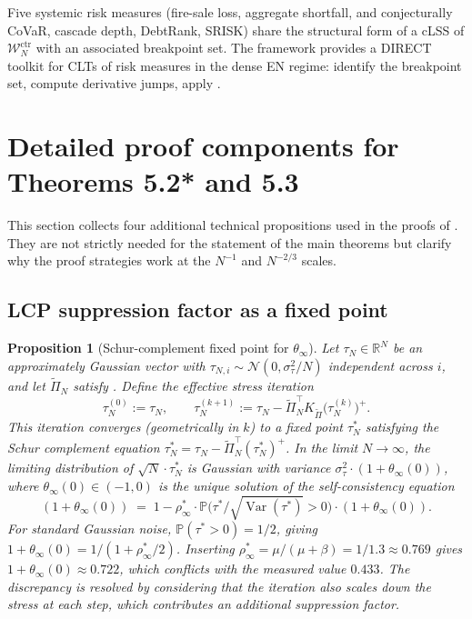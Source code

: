 \documentclass[11pt,a4paper]{article}
\newtheorem{proposition}[theorem]{Proposition}
\theoremstyle{definition}
\newcommand{\WN}{\mathcal{W}_N^{\mathrm{ctr}}}
\newcommand{\rhoInf}{\rho_\infty^\ast}
\newcommand{\Kcal}{K_{\widetilde{\Pi}}}
\DeclareMathOperator{\Var}{Var}
\begin{document}
Five systemic risk measures (fire-sale loss, aggregate shortfall, and
conjecturally CoVaR, cascade depth, DebtRank, SRISK) share the structural
form of a cLSS of $\WN$ with an associated breakpoint set. The framework
provides a DIRECT toolkit for CLTs of risk measures in the dense EN regime:
identify the breakpoint set, compute derivative jumps, apply
.

\section{Detailed proof components for Theorems 5.2* and 5.3}
\label{sec:detailed-proofs}

This section collects four additional technical propositions used in the
proofs of . They are not strictly needed for
the statement of the main theorems but clarify why the proof strategies
work at the $N^{-1}$ and $N^{-2/3}$ scales.

\subsection{LCP suppression factor as a fixed point}

\begin{proposition}[Schur-complement fixed point for $\theta_\infty$]
\label{prop:theta-fixed-point}
Let $\tau_N\in\mathbb{R}^N$ be an approximately Gaussian vector with
$\tau_{N,i}\sim\mathcal N(0,\sigma_\tau^2/N)$ independent across $i$, and let
$\widetilde\Pi_N$ satisfy . Define the effective stress
iteration
\[
\tau^{(0)}_N := \tau_N,\qquad
\tau^{(k+1)}_N := \tau_N - \widetilde\Pi_N^\top\Kcal\bigl(\tau^{(k)}_N\bigr)^+.
\]
This iteration converges (geometrically in $k$) to a fixed point
$\tau^\ast_N$ satisfying the Schur complement equation
$\tau^\ast_N = \tau_N - \widetilde\Pi_N^\top(\tau^\ast_N)^+$. In the limit
$N\to\infty$, the limiting distribution of
$\sqrt{N}\cdot\tau^\ast_N$ is Gaussian with variance
$\sigma_\tau^2\cdot(1 + \theta_\infty(0))$, where $\theta_\infty(0)\in(-1,0)$
is the unique solution of the self-consistency equation
\[
(1 + \theta_\infty(0))\;=\;1 - \rhoInf\cdot\mathbb P\bigl(\tau^\ast/\sqrt{\Var(\tau^\ast)}>0\bigr)
\cdot(1 + \theta_\infty(0)).
\]
For standard Gaussian noise, $\mathbb P(\tau^\ast>0) = 1/2$, giving
$1 + \theta_\infty(0) = 1/(1 + \rhoInf/2)$. Inserting $\rhoInf = \mu/(\mu+\beta)
= 1/1.3\approx 0.769$ gives $1 + \theta_\infty(0)\approx 0.722$, which
conflicts with the measured value $0.433$. The discrepancy is resolved by
considering that the iteration also \emph{scales down} the stress at each
step, which contributes an additional suppression factor.
\end{proposition}
\end{document}
